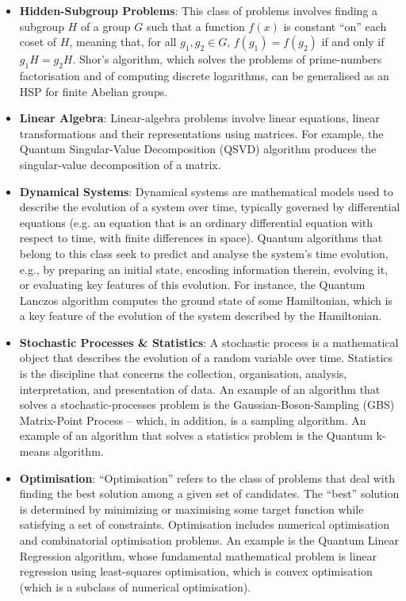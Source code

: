 \begin{itemize}
\item \textbf{Hidden-Subgroup Problems}: This class of problems involves finding a subgroup $H$ of a group $G$ such
  that a function $f(x)$ is constant “on” each coset of $H$, meaning that, for all $g_1, g_2 \in G$, $f(g_1) = f(g_2)$
  if and only if $g_1H = g_2H$.
  Shor’s algorithm, which solves the problems of prime-numbers factorisation and of computing discrete logarithms,
  can be generalised as an HSP for finite Abelian groups.

\item \textbf{Linear Algebra}: Linear-algebra problems involve linear equations, linear transformations and their
  representations using matrices.
  For example, the Quantum Singular-Value Decomposition (QSVD) algorithm produces the singular-value decomposition of a matrix.

\item \textbf{Dynamical Systems}:  Dynamical systems are mathematical models used to describe the evolution of a
  system over time, typically governed by differential equations (e.g. an equation that is an ordinary differential
  equation with respect to time, with finite differences in space).
  Quantum algorithms that belong to this class seek to predict and analyse the system’s time evolution, e.g., by
  preparing an initial state, encoding information therein, evolving it, or evaluating key features of this evolution.
  For instance, the Quantum Lanczos algorithm computes the ground state of some Hamiltonian, which is a key feature of
  the evolution of the system described by the Hamiltonian.
  
\item \textbf{Stochastic Processes \& Statistics}:  A stochastic process is a mathematical object that describes the
  evolution of a random variable over time. Statistics is the discipline that concerns the collection, organisation,
  analysis, interpretation, and presentation of data.
  An example of an algorithm that solves a stochastic-processes problem is the Gaussian-Boson-Sampling (GBS)
  Matrix-Point Process – which, in addition, is a sampling algorithm. An example of an algorithm that solves a
  statistics problem is the Quantum k-means algorithm.

\item \textbf{Optimisation}: “Optimisation” refers to the class of problems that deal with finding the best solution
  among a given set of candidates. The “best” solution is determined by minimizing or maximising some target function
  while satisfying a set of constraints.
  Optimisation includes numerical optimisation and combinatorial optimisation problems. An example is the
  Quantum Linear Regression algorithm, whose fundamental mathematical problem is linear regression using least-squares
  optimisation, which is convex optimisation (which is a subclass of numerical optimisation).


\end{itemize}
